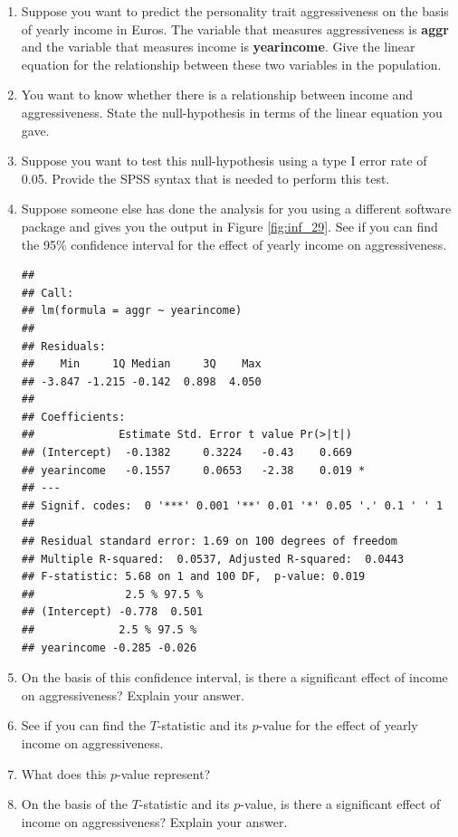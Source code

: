 \documentclass[]{book}\usepackage[]{graphicx}\usepackage[]{color}
\makeatletter
\newenvironment{kframe}{%
 \def\at@end@of@kframe{}%
 \ifinner\ifhmode%
  \def\at@end@of@kframe{\end{minipage}}%
  \begin{minipage}{\columnwidth}%
 \fi\fi%
 \def\FrameCommand##1{\hskip\@totalleftmargin \hskip-\fboxsep
 \colorbox{shadecolor}{##1}\hskip-\fboxsep
     \hskip-\linewidth \hskip-\@totalleftmargin \hskip\columnwidth}%
 \MakeFramed {\advance\hsize-\width
   \@totalleftmargin\z@ \linewidth\hsize
   \@setminipage}}%
 {\par\unskip\endMakeFramed%
 \at@end@of@kframe}
\newenvironment{knitrout}{}{} %
\makeatother
\begin{document}
\begin{enumerate}
\item Suppose you want to predict the personality trait aggressiveness on the basis of yearly income in Euros. The variable that measures aggressiveness is \textbf{aggr} and the variable that measures income is \textbf{yearincome}. Give the linear equation for the relationship between these two variables in the population.

\item You want to know whether there is a relationship between income and aggressiveness. State the null-hypothesis in terms of the linear equation you gave.

\item Suppose you want to test this null-hypothesis using a type I error rate of 0.05. Provide the SPSS syntax that is needed to perform this test.

\item Suppose someone else has done the analysis for you using a different software package and gives you the output in Figure \ref{fig:inf_29}. See if you can find the 95\% confidence interval for the effect of yearly income on aggressiveness.

\begin{knitrout}
\color{fgcolor}\begin{kframe}
\begin{verbatim}
## 
## Call:
## lm(formula = aggr ~ yearincome)
## 
## Residuals:
##    Min     1Q Median     3Q    Max 
## -3.847 -1.215 -0.142  0.898  4.050 
## 
## Coefficients:
##             Estimate Std. Error t value Pr(>|t|)  
## (Intercept)  -0.1382     0.3224   -0.43    0.669  
## yearincome   -0.1557     0.0653   -2.38    0.019 *
## ---
## Signif. codes:  0 '***' 0.001 '**' 0.01 '*' 0.05 '.' 0.1 ' ' 1
## 
## Residual standard error: 1.69 on 100 degrees of freedom
## Multiple R-squared:  0.0537,	Adjusted R-squared:  0.0443 
## F-statistic: 5.68 on 1 and 100 DF,  p-value: 0.019
##              2.5 % 97.5 %
## (Intercept) -0.778  0.501
##             2.5 % 97.5 %
## yearincome -0.285 -0.026
\end{verbatim}
\end{kframe}
\end{knitrout}


\item On the basis of this confidence interval, is there a significant effect of income on aggressiveness? Explain your answer.

\item See if you can find the $T$-statistic and its $p$-value for the effect of yearly income on aggressiveness.

\item What does this $p$-value represent?

\item On the basis of the $T$-statistic and its $p$-value, is there a significant effect of income on aggressiveness? Explain your answer.


\end{enumerate}
\end{document}

